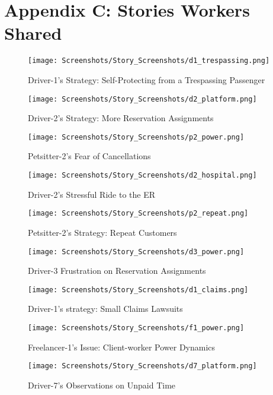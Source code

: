 \section{Appendix C: Stories Workers Shared}
\begin{figure}[H]
    \texttt{[image: Screenshots/Story\_Screenshots/d1\_trespassing.png]}
    \caption{Driver-1's Strategy: Self-Protecting from a Trespassing Passenger}
    \label{phone_customer}
\end{figure}
\begin{figure}[H]
    \texttt{[image: Screenshots/Story\_Screenshots/d2\_platform.png]}
    \caption{Driver-2's Strategy: More Reservation Assignments}
    \label{reservation}
\end{figure}
\begin{figure}[H]
    \texttt{[image: Screenshots/Story\_Screenshots/p2\_power.png]}
    \caption{Petsitter-2's Fear of Cancellations}
    \label{power}
\end{figure}
\begin{figure}[H]
    \texttt{[image: Screenshots/Story\_Screenshots/d2\_hospital.png]}
    \caption{Driver-2's Stressful Ride to the ER}
    \label{d2_hospital}    
\end{figure}
\begin{figure}[H]
    \texttt{[image: Screenshots/Story\_Screenshots/p2\_repeat.png]}
    \caption{Petsitter-2's Strategy: Repeat Customers}
    \label{p2_repeat}
\end{figure}
\begin{figure}[H]
    \texttt{[image: Screenshots/Story\_Screenshots/d3\_power.png]}
    \caption{Driver-3 Frustration on Reservation Assignments}
    \label{d3_power}
\end{figure}
\begin{figure}[H]
    \texttt{[image: Screenshots/Story\_Screenshots/d1\_claims.png]}
    \caption{Driver-1's strategy: Small Claims Lawsuits}
    \label{small-claims}    
\end{figure}
\begin{figure}[H]
    \texttt{[image: Screenshots/Story\_Screenshots/f1\_power.png]}
    \caption{Freelancer-1's Issue: Client-worker Power Dynamics}
    \label{f1_power}
\end{figure}
\begin{figure}[H]
        \texttt{[image: Screenshots/Story\_Screenshots/d7\_platform.png]}
    \caption{Driver-7's Observations on Unpaid Time }
    \label{d7_platform}
\end{figure}
